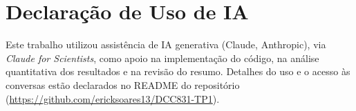 \documentclass{article}
\begin{document}
\section{Declaração de Uso de IA}

Este trabalho utilizou assistência de IA generativa (Claude, Anthropic), via
\emph{Claude for Scientists}, como apoio na implementação do código, na análise
quantitativa dos resultados e na revisão do resumo. Detalhes do uso e o acesso
às conversas estão declarados no README do repositório
(\url{https://github.com/ericksoares13/DCC831-TP1}).


\end{document}
